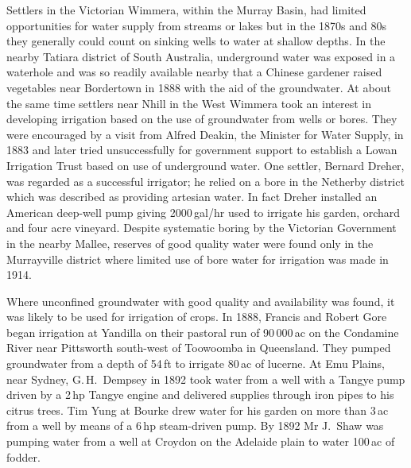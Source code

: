 Settlers in the Victorian Wimmera, within the Murray Basin, had
limited opportunities for water supply from streams or lakes but in
the 1870s and 80s they generally could count on sinking wells to water
at shallow depths.  In the nearby Tatiara district of South Australia,
underground water was exposed in a waterhole and was so readily
available nearby that a Chinese gardener raised vegetables near
Bordertown in 1888 with the aid of the groundwater. At about the same
time settlers near Nhill in the West Wimmera took an interest in
developing irrigation based on the use of groundwater from wells or
bores.  They were encouraged by a visit from Alfred Deakin, the
Minister for Water Supply, in 1883 and later tried unsuccessfully for
government support to establish a Lowan Irrigation Trust based on use
of underground water.  One settler, Bernard Dreher, was regarded as a
successful irrigator; he relied on a bore in the Netherby district
which was described as providing artesian water.  In fact Dreher
installed an American deep-well pump giving 2000\,gal/hr used to
irrigate his garden, orchard and four acre vineyard.  Despite
systematic boring by the Victorian Government in the nearby Mallee,
reserves of good quality water were found only in the Murrayville
district where limited use of bore water for irrigation was made in
1914.

Where unconfined groundwater with good quality and availability was
found, it was likely to be used for irrigation of crops.  In 1888,
Francis and Robert Gore began irrigation at Yandilla on their pastoral
run of 90\,000\,ac on the Condamine River near Pittsworth south-west
of Toowoomba in Queensland.  They pumped groundwater from a depth of
54\,ft to irrigate 80\,ac of lucerne. At Emu Plains, near Sydney,
G.\,H.~Dempsey in 1892 took water from a well with a Tangye pump
driven by a 2\,hp Tangye engine and delivered supplies through iron
pipes to his citrus trees.  Tim Yung at Bourke drew water for his
garden on more than 3\,ac from a well by means of a 6\,hp steam-driven
pump. By 1892 Mr J.~Shaw was pumping water from a well at Croydon on
the Adelaide plain to water 100\,ac of
fodder.

